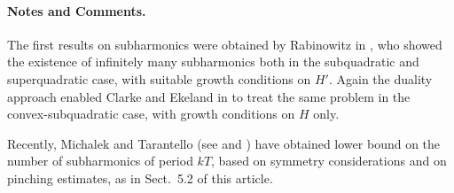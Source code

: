 \documentclass{svproc}
\begin{document}
\paragraph{Notes and Comments.}
The first results on subharmonics were
obtained by Rabinowitz in \cite{fo:kes:nic:tue}, who showed the existence of
infinitely many subharmonics both in the subquadratic and superquadratic
case, with suitable growth conditions on $H'$. Again the duality
approach enabled Clarke and Ekeland in \cite{may:ehr:stein} to treat the
same problem in the convex-subquadratic case, with growth conditions on
$H$ only.

Recently, Michalek and Tarantello (see \cite{fost:kes} and \cite{czaj:fitz})
have obtained lower bound on the number of subharmonics of period $kT$,
based on symmetry considerations and on pinching estimates, as in
Sect.~5.2 of this article.

%
%

\begin{thebibliography}{6}
\printbibliography







\end{thebibliography}
\end{document}
